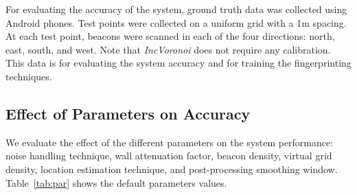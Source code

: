 \documentclass[conference]{IEEEtran}
\def \sys {\textit{IncVoronoi}}
\begin{document}
For evaluating the accuracy of the system, ground truth data was collected using Android phones. Test points were collected on a uniform grid with a 1m spacing. 
At each test point, beacons were scanned in each of the four directions: north, east, south, and west. 
 Note that \sys{} does not require any calibration. This data is for evaluating the system accuracy and for training the fingerprinting techniques. 

\begin{table}[!t]
\centering
{}
\caption{Testbed parameters.}
\label{tab:comp}
\end{table}

\begin{table}[!t]
\centering
{}
\caption{Default parameters values used in evaluation.}
\label{tab:par}
\end{table}

\subsection{Effect of Parameters on Accuracy}
We evaluate the effect of the different parameters on the system performance: noise handling technique, wall attenuation factor, beacon density, virtual grid density, 
 location estimation technique, and post-processing smoothing window. 
Table~\ref{tab:par} shows the default parameters values.
\end{document}
